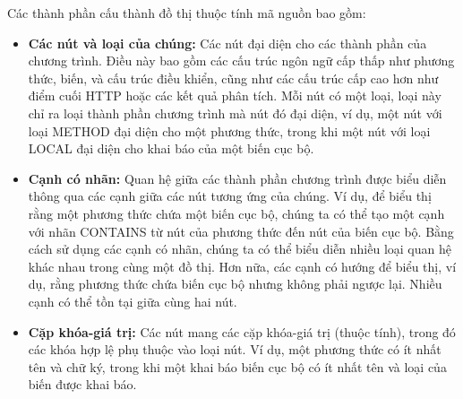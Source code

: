 

Các thành phần cấu thành đồ thị thuộc tính mã nguồn bao gồm:

\begin{itemize}
  \item \textbf{Các nút và loại của chúng:} Các nút đại diện cho các thành phần của chương trình.
  Điều này bao gồm các cấu trúc ngôn ngữ cấp thấp như phương thức, biến, và cấu trúc điều khiển, cũng như các cấu trúc cấp cao hơn như điểm cuối HTTP hoặc các kết quả phân tích.
  Mỗi nút có một loại, loại này chỉ ra loại thành phần chương trình mà nút đó đại diện, ví dụ, một nút với loại METHOD đại diện cho một phương thức, trong khi một nút với loại LOCAL đại diện cho khai báo của một biến cục bộ.
  \item \textbf{Cạnh có nhãn:} Quan hệ giữa các thành phần chương trình được biểu diễn thông qua các cạnh giữa các nút tương ứng của chúng.
  Ví dụ, để biểu thị rằng một phương thức chứa một biến cục bộ, chúng ta có thể tạo một cạnh với nhãn CONTAINS từ nút của phương thức đến nút của biến cục bộ.
  Bằng cách sử dụng các cạnh có nhãn, chúng ta có thể biểu diễn nhiều loại quan hệ khác nhau trong cùng một đồ thị.
  Hơn nữa, các cạnh có hướng để biểu thị, ví dụ, rằng phương thức chứa biến cục bộ nhưng không phải ngược lại.
  Nhiều cạnh có thể tồn tại giữa cùng hai nút.
  \item \textbf{Cặp khóa-giá trị:} Các nút mang các cặp khóa-giá trị (thuộc tính), trong đó các khóa hợp lệ phụ thuộc vào loại nút.
  Ví dụ, một phương thức có ít nhất tên và chữ ký, trong khi một khai báo biến cục bộ có ít nhất tên và loại của biến được khai báo.
\end{itemize}


